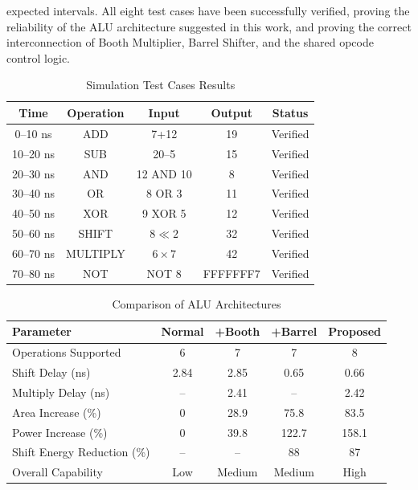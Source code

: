 \documentclass[conference]{IEEEtran}
\begin{document}
expected intervals. All eight test cases have been successfully verified, proving the reliability of the ALU architecture suggested in this work, and proving the correct interconnection of Booth Multiplier, Barrel Shifter, and the shared opcode control logic.

\begin{table}[h]
\renewcommand{\arraystretch}{1.3}
\setlength{\tabcolsep}{5pt}
\caption{Simulation Test Cases Results}
\label{tab:testcases}
\centering
\begin{tabular}{|c|c|c|c|c|}
\hline
\textbf{Time} & \textbf{Operation} & \textbf{Input} & \textbf{Output} & \textbf{Status} \\
\hline
0--10 ns & ADD & 7+12 & 19 & Verified \\
\hline
10--20 ns & SUB & 20--5 & 15 & Verified \\
\hline
20--30 ns & AND & 12 AND 10 & 8 & Verified \\
\hline
30--40 ns & OR & 8 OR 3 & 11 & Verified \\
\hline
40--50 ns & XOR & 9 XOR 5 & 12 & Verified \\
\hline
50--60 ns & SHIFT & $8 \ll 2$ & 32 & Verified \\
\hline
60--70 ns & MULTIPLY & $6 \times 7$ & 42 & Verified \\
\hline
70--80 ns & NOT & NOT 8 & FFFFFFF7 & Verified \\
\hline
\end{tabular}
\end{table}


\begin{table}[h]
\centering
\caption{Comparison of ALU Architectures}
\label{tab:final_comp}
\begin{tabular}{|l|c|c|c|c|}
\hline
\textbf{Parameter} & \textbf{Normal} & \textbf{+Booth} & \textbf{+Barrel} & \textbf{Proposed} \\
\hline
Operations Supported & 6 & 7 & 7 & 8 \\
\hline
Shift Delay (ns) & 2.84 & 2.85 & 0.65 & 0.66 \\
\hline
Multiply Delay (ns) & -- & 2.41 & -- & 2.42 \\
\hline
Area Increase (\%) & 0 & 28.9 & 75.8 & 83.5 \\
\hline
Power Increase (\%) & 0 & 39.8 & 122.7 & 158.1 \\
\hline
Shift Energy Reduction (\%) & -- & -- & 88 & 87 \\
\hline
Overall Capability & Low & Medium & Medium & High \\
\hline
\end{tabular}
\end{table}
\end{document}
